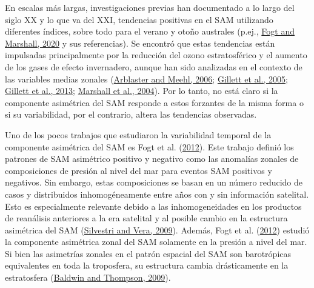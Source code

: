 \documentclass[12pt,oneside,a4paper]{reedthesis}
\begin{document}
En escalas más largas, investigaciones previas han documentado a lo largo del siglo XX y lo que va del XXI, tendencias positivas en el SAM utilizando diferentes índices, sobre todo para el verano y otoño australes (p.ej., \protect\hyperlink{ref-fogt2020}{Fogt and Marshall, 2020} y sus referencias).
Se encontró que estas tendencias están impulsadas principalmente por la reducción del ozono estratosférico y el aumento de los gases de efecto invernadero, aunque han sido analizadas en el contexto de las variables medias zonales (\protect\hyperlink{ref-arblaster2006}{Arblaster and Meehl, 2006}; \protect\hyperlink{ref-gillett2005}{Gillett et al., 2005}; \protect\hyperlink{ref-gillett2013}{Gillett et al., 2013}; \protect\hyperlink{ref-marshall2004}{Marshall et al., 2004}).
Por lo tanto, no está claro si la componente asimétrica del SAM responde a estos forzantes de la misma forma o si su variabilidad, por el contrario, altera las tendencias observadas.

Uno de los pocos trabajos que estudiaron la variabilidad temporal de la componente asimétrica del SAM es Fogt et al. (\protect\hyperlink{ref-fogt2012}{2012}).
Este trabajo definió los patrones de SAM asimétrico positivo y negativo como las anomalías zonales de composiciones de presión al nivel del mar para eventos SAM positivos y negativos.
Sin embargo, estas composiciones se basan en un número reducido de casos y distribuidos inhomogéneamente entre años con y sin información satelital.
Esto es especialmente relevante debido a las inhomogeneidades en los productos de reanálisis anteriores a la era satelital y al posible cambio en la estructura asimétrica del SAM (\protect\hyperlink{ref-silvestri2009}{Silvestri and Vera, 2009}).
Además, Fogt et al. (\protect\hyperlink{ref-fogt2012}{2012}) estudió la componente asimétrica zonal del SAM solamente en la presión a nivel del mar.
Si bien las asimetrías zonales en el patrón espacial del SAM son barotrópicas equivalentes en toda la troposfera, su estructura cambia drásticamente en la estratosfera (\protect\hyperlink{ref-baldwin2009}{Baldwin and Thompson, 2009}).
\end{document}
